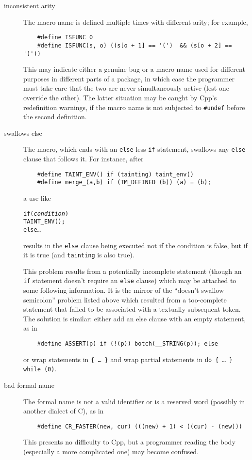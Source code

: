 \documentclass[10pt]{article}
\begin{document}
\begin{description}
\item[inconsistent arity]
        The macro name is defined multiple times with different arity; for example,
\begin{verbatim}
    #define ISFUNC 0
    #define ISFUNC(s, o) ((s[o + 1] == '(')  && (s[o + 2] == ')'))
\end{verbatim}
        This may indicate either a genuine bug or a macro name used for
        different purposes in different parts of a package, in which case
        the programmer must take care that the two are never simultaneously
        active (lest one override the other).  The latter situation may be
        caught by Cpp's redefinition warnings, if the macro name is not
        subjected to {\tt \#undef} before the second definition.

\item[swallows else]
        The macro, which ends with an {\tt else}-less {\tt if} statement,
        swallows any {\tt else} clause that follows it.  For instance, after
\begin{verbatim}
    #define TAINT_ENV() if (tainting) taint_env()
    #define merge_(a,b) if (TM_DEFINED (b)) (a) = (b);
\end{verbatim}
        a use like
\begin{alltt}
    if ({\rm\em{}condition})
      TAINT_ENV();
    else \ldots
\end{alltt}
        results in the {\tt else} clause being executed not if  the
        condition is false, but if it is true (and {\tt tainting} is also
        true).
        
        This problem results from a potentially incomplete statement (though
        an {\tt if} statement doesn't require an {\tt else} clause) which
        may be attached to some following information.  It is the mirror of
        the ``doesn't swallow semicolon'' problem listed above which
        resulted from a too-complete statement that failed to be
        associated with a textually subsequent token.  The solution is
        similar: either add an else clause with an empty statement, as in
\begin{verbatim}
    #define ASSERT(p) if (!(p)) botch(__STRING(p)); else
\end{verbatim}
        or wrap statements in {\tt \verb|{| \ldots\ \verb|}|} and wrap
        partial statements in {\tt do \verb|{| {\rm \ldots}\ \verb|}| while
        (0)}.

\item[bad formal name]
        The formal name is not a valid identifier or is a reserved word
        (possibly in another dialect of C), as in
\begin{verbatim}
    #define CR_FASTER(new, cur) (((new) + 1) < ((cur) - (new)))
\end{verbatim}
        This presents no difficulty to Cpp, but a programmer reading the
        body (especially a more complicated one) may become confused.

\end{description}
\end{document}
